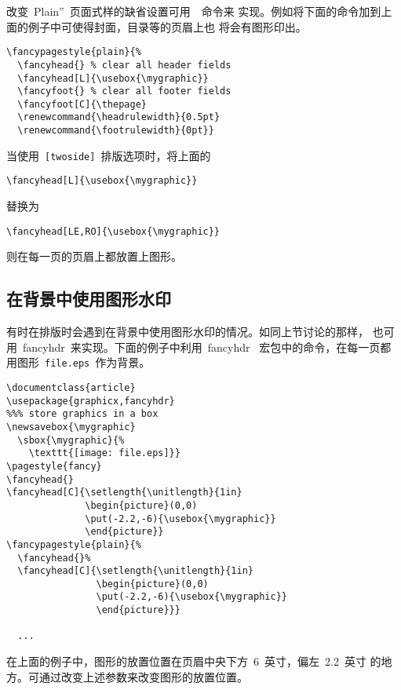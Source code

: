 改变~Plain''~页面式样的缺省设置可用~~命令来
实现。例如将下面的命令加到上面的例子中可使得封面，目录等的页眉上也
将会有图形印出。
\begin{Verbatim}[xleftmargin=1cm]
\fancypagestyle{plain}{%
  \fancyhead{} % clear all header fields
  \fancyhead[L]{\usebox{\mygraphic}}
  \fancyfoot{} % clear all footer fields
  \fancyfoot[C]{\thepage}
  \renewcommand{\headrulewidth}{0.5pt}
  \renewcommand{\footrulewidth}{0pt}}
\end{Verbatim}

当使用~\texttt{[twoside]}~排版选项时，将上面的
\begin{Verbatim}[xleftmargin=1cm]
\fancyhead[L]{\usebox{\mygraphic}}
\end{Verbatim}
替换为
\begin{Verbatim}[xleftmargin=1cm]
\fancyhead[LE,RO]{\usebox{\mygraphic}}
\end{Verbatim}
则在每一页的页眉上都放置上图形。

\subsection{在背景中使用图形水印}\label{ssec:watermark}

有时在排版时会遇到在背景中使用图形水印的情况。如同上节讨论的那样，
也可用~\textsf{fancyhdr}~来实现。下面的例子中利用~\textsf{fancyhdr}~
宏包中的命令，在每一页都用图形~\texttt{file.eps}~作为背景。

\begin{Verbatim}
\documentclass{article}
\usepackage{graphicx,fancyhdr}
%%% store graphics in a box
\newsavebox{\mygraphic}
  \sbox{\mygraphic}{%
    \texttt{[image: file.eps]}}
\pagestyle{fancy}
\fancyhead{}
\fancyhead[C]{\setlength{\unitlength}{1in}
              \begin{picture}(0,0)
              \put(-2.2,-6){\usebox{\mygraphic}}
              \end{picture}}
\fancypagestyle{plain}{%
  \fancyhead{}%
  \fancyhead[C]{\setlength{\unitlength}{1in}
                \begin{picture}(0,0)
                \put(-2.2,-6){\usebox{\mygraphic}}
                \end{picture}}}

  ...

\end{Verbatim}

在上面的例子中，图形的放置位置在页眉中央下方~6~英寸，偏左~2.2~英寸
的地方。可通过改变上述参数来改变图形的放置位置。

